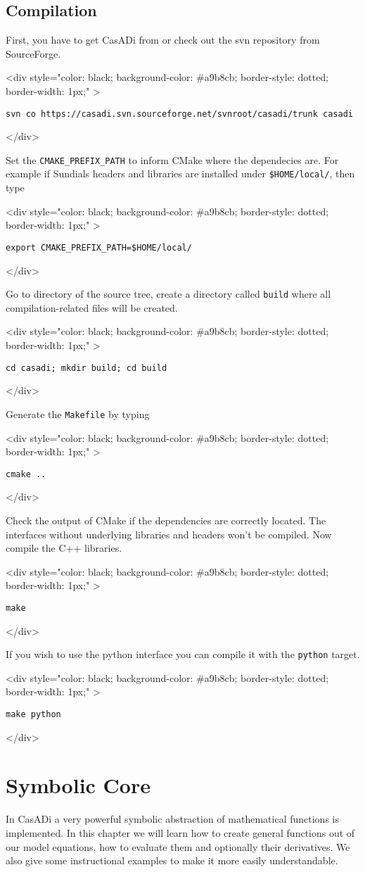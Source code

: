 \documentclass[a4paper,12pt]{book}
\newcommand{\codebegin}{
\begin{rawhtml}
<div style="color: black; background-color: \#a9b8cb;  border-style: dotted; border-width: 1px;" >
\end{rawhtml}
}
\newcommand{\codeend}{
\begin{rawhtml}
</div>
\end{rawhtml}
}
\newcommand{\codebegin}{

}
\newcommand{\codeend}{

}
\begin{document}
\section{Compilation}
First, you have to get CasADi from  or check out the svn repository from SourceForge.
\par
\codebegin
\begin{verbatim}
svn co https://casadi.svn.sourceforge.net/svnroot/casadi/trunk casadi
\end{verbatim}
\codeend
Set the \texttt{CMAKE\_PREFIX\_PATH} to inform CMake where the dependecies are. 
For example if Sundials headers and libraries are installed under \texttt{\$HOME/local/}, then type
\par
\codebegin{
\begin{verbatim}
export CMAKE_PREFIX_PATH=$HOME/local/
\end{verbatim}
\codeend
\par
Go to directory of the source tree, create a directory called \texttt{build} where all compilation-related files will be created.
\par
\codebegin
\begin{verbatim}
cd casadi; mkdir build; cd build
\end{verbatim}
\codeend
Generate the \texttt{Makefile} by typing
\par
\codebegin
\begin{verbatim}
cmake ..
\end{verbatim}
\codeend
Check the output of CMake if the dependencies are correctly located. The interfaces without underlying libraries and headers won't be compiled.
Now compile the C++ libraries.
\par
\codebegin
\begin{verbatim}
make
\end{verbatim}
\codeend
If you wish to use the python interface you can compile it with the \texttt{python} target.
\par
\codebegin
\begin{verbatim}
make python
\end{verbatim}
\codeend

\chapter{Symbolic Core}
In CasADi a very powerful symbolic abstraction of mathematical functions is implemented.
In this chapter we will learn how to create general functions out of our model equations, 
how to evaluate them and optionally their derivatives. We also give some instructional
examples to make it more easily understandable.
}
\end{document}
